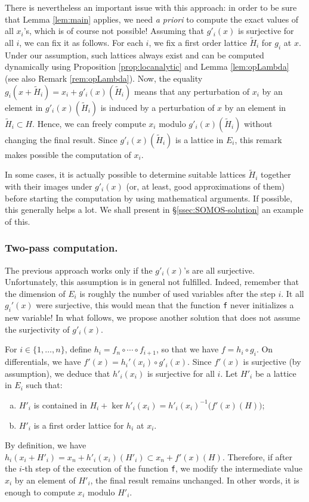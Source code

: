\documentclass{lms}
\begin{document}
There is nevertheless an important issue with this approach: in order to 
be sure that Lemma \ref{lem:main} applies, we need \emph{a priori} to 
compute the exact values of all $x_i$'s, which is of course not 
possible! Assuming that $g'_i(x)$ is surjective for all $i$, we can fix 
it as follows. For each $i$, we fix a first order lattice $\tilde H_i$ 
for $g_i$ at $x$. Under our assumption, such lattices always exist and 
can be computed dynamically using Proposition \ref{prop:locanalytic}
and Lemma \ref{lem:opLambda} (see also Remark \ref{rem:opLambda}).
Now, the equality $g_i(x + \tilde H_i) = x_i + g'_i(x)(\tilde H_i)$ 
means that any perturbation of $x_i$ by an element in $g'_i(x) (\tilde 
H_i)$ is induced by a perturbation of $x$ by an element in $\tilde H_i 
\subset H$. Hence, we can freely compute $x_i$ modulo $g'_i(x) (\tilde 
H_i)$ without changing the final result. Since $g'_i(x)(\tilde H_i)$ is 
a lattice in $E_i$, this remark makes possible the computation of $x_i$.

\begin{rmk}
In some cases, it is actually possible to determine suitable lattices 
$\tilde H_i$ together with their images under $g'_i(x)$ (or, at
least, good approximations of them) before starting the computation 
by using mathematical arguments. If possible, this generally helps a
lot. We shall present in \S \ref{ssec:SOMOS-solution} an example of 
this.
\end{rmk}

\subsubsection*{Two-pass computation.}

The previous approach works only if the $g'_i(x)$'s are all surjective. 
Unfortunately, this assumption is in general not fulfilled. Indeed, 
remember that the dimension of $E_i$ is roughly the number of used 
variables after the step $i$. It all $g_i'(x)$ were surjective, this 
would mean that the function {\tt f} never initializes a new variable!
In what follows, we propose another solution that does not assume the
surjectivity of $g'_i(x)$.

For $i \in \{1, \ldots, n\}$, define $h_i = f_n \circ \cdots \circ 
f_{i+1}$, so that we have $f = h_i \circ g_i$. On differentials, we 
have $f'(x) = h_i'(x_i) \circ g'_i(x)$. Since $f'(x)$ is surjective (by 
assumption), we deduce that $h'_i(x_i)$ is surjective for all $i$. Let $H'_i$ 
be a lattice in $E_i$ such that:
\begin{enumerate}[(a)] 
\item \label{item:Hi1}
$H'_i$ is contained in $H_i + \ker h'_i(x_i) = h'_i(x_i)^{-1}
\big(f'(x)(H)\big)$;
\item \label{item:Hi2}
$H'_i$ is a first order lattice for $h_i$ at $x_i$.
\end{enumerate}
By definition, we have
$h_i(x_i + H'_i) = x_n + h'_i(x_i)(H'_i) \subset x_n + f'(x)(H)$.
Therefore, if after the $i$-th step of the execution of the function
{\tt f}, we modify the intermediate value $x_i$ by an element of
$H'_i$, the final result remains unchanged. In other words, it is
enough to compute $x_i$ modulo $H'_i$.
\end{document}
